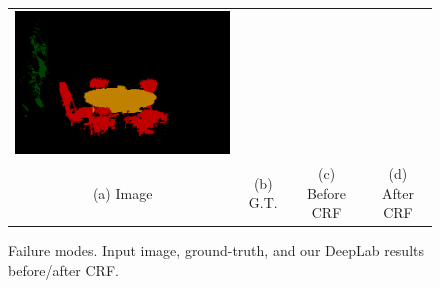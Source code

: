 \begin{figure}[!t]
{\begin{tabular} {c c c c}
    \includegraphics[width=0.24\linewidth]{fig/failure_mode/voc12/resnet101_noup_pool3_coco_22/after_crf/2009_002487.png} \\
                    {\scriptsize (a) Image} &
                    {\scriptsize (b) G.T.} &
                    {\scriptsize (c) Before CRF} &
                    {\scriptsize (d) After CRF} \\
  \end{tabular}

}
  \caption{Failure modes. Input image, ground-truth, and our DeepLab results before/after CRF.}  
  \label{fig:failure_modes}
\end{figure}
